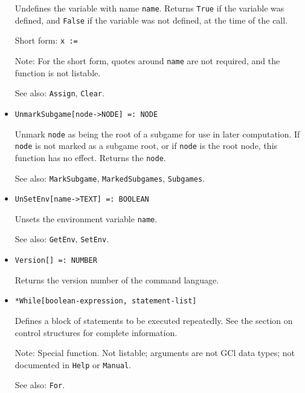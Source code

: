 \begin{itemize}
\bd
Undefines the variable with name \verb+name+.  Returns 
\verb+True+ if the variable was defined, and \verb+False+ if the
variable was not defined, at the time of the call.
\item [Short form:] \verb+x := +
\item [Note:] For the short form, quotes around \verb+name+ are not
required, and the function is not listable.
\item [See also:] \verb+Assign+, \verb+Clear+.
\ed

\item{}
\protect \large \begin{verbatim}
UnmarkSubgame[node->NODE] =: NODE 
\end{verbatim}\normalsize

\bd
Unmark \verb+node+ as being the root of a subgame for use in later
computation.  If \verb+node+ is not marked as a subgame root, or if
\verb+node+ is the root node, this function has no effect.  Returns
the \verb+node+.
\item [See also:] \verb+MarkSubgame+, \verb+MarkedSubgames+,
\verb+Subgames+.
\ed


\item{}
\protect \large \begin{verbatim}
UnSetEnv[name->TEXT] =: BOOLEAN 
\end{verbatim} \normalsize

\bd
Unsets the environment variable \verb+name+.
\item [See also:] \verb+GetEnv+, \verb+SetEnv+.
\ed


\item{}
\protect \large \begin{verbatim}
Version[] =: NUMBER 
\end{verbatim} \normalsize

\bd
Returns the version number of the command language.
\ed



\item{} 
\protect \large \begin{verbatim}
*While[boolean-expression, statement-list]
\end{verbatim} \normalsize
  
\bd
Defines a block of statements to be executed repeatedly.
See the section on control structures for complete information.
\item [Note:] Special function.  Not listable; arguments are not GCl
data types; not documented in \verb+Help+ or \verb+Manual+.  
\item
[See also:] \verb+For+.
\ed


\end{itemize}
